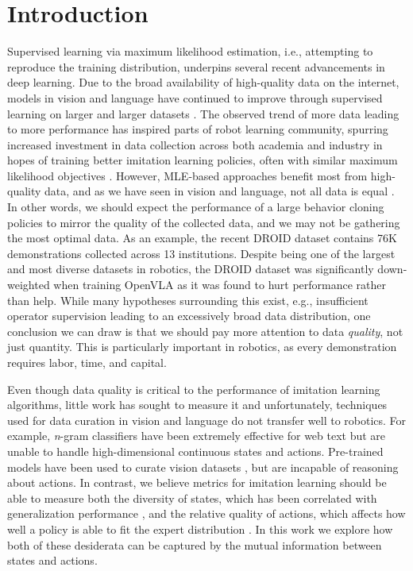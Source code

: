 \section{Introduction}

Supervised learning via maximum likelihood estimation, i.e., attempting to reproduce the training distribution, underpins several recent advancements in deep learning. 
Due to the broad availability of high-quality data on the internet, models in vision \citep{radford2021learning} and language \citep{radford2019language} have continued to improve through supervised learning on larger and larger datasets \citep{kaplan2020scaling, zhai2022scaling}.
The observed trend of more data leading to more performance has inspired parts of robot learning community, spurring increased investment in data collection across both academia and industry \citep{openx, rh20t, droid, bridge} in hopes of training better imitation learning policies, often with similar maximum likelihood objectives \citep{octo,rt1}. However, MLE-based approaches benefit most from high-quality data, and as we have seen in vision and language, not all data is equal \citep{xu2024demystifying}. In other words, we should expect the performance of a large behavior cloning policies to mirror the quality of the collected data, and we may not be gathering the most optimal data. As an example, the recent DROID dataset \citep{droid} contains 76K demonstrations collected across 13 institutions. Despite being one of the largest and most diverse datasets in robotics, the DROID dataset was significantly down-weighted when training OpenVLA \citep{kim2024openvla} as it was found to hurt performance rather than help. While many hypotheses surrounding this exist, e.g., insufficient operator supervision leading to an excessively broad data distribution, one conclusion we can draw is that we should pay more attention to data \emph{quality}, not just quantity. This is particularly important in robotics, as every demonstration requires labor, time, and capital. 

Even though data quality is critical to the performance of imitation learning algorithms, little work has sought to measure it \citep{belkhale2024data} and unfortunately, techniques used for data curation in vision and language do not transfer well to robotics. For example, \textit{n}-gram classifiers have been extremely effective for web text \citep{albalak2024survey} but are unable to handle high-dimensional continuous states and actions. Pre-trained models have been used to curate vision datasets \citep{schuhmann2022laion}, but are incapable of reasoning about actions. In contrast, we believe metrics for imitation learning should be able to measure both the diversity of states, which has been correlated with generalization performance \citep{gao2024efficient, lin2024datascalinglawsimitation}, and the relative quality of actions, which affects how well a policy is able to fit the expert distribution \citep{belkhale2024data}. In this work we explore how both of these desiderata can be captured by the mutual information between states and actions. 

